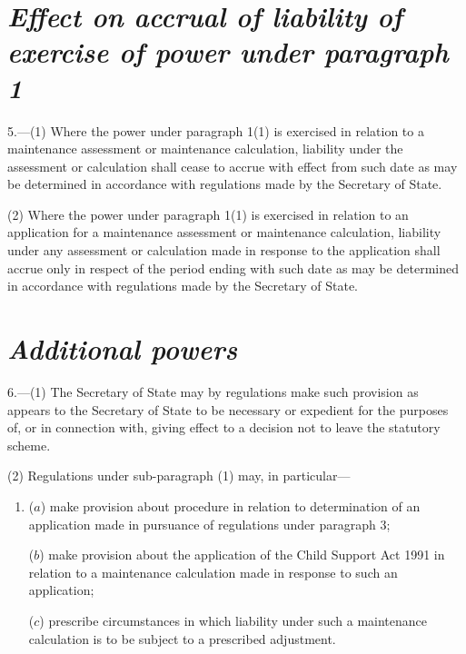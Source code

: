 \documentclass[12pt,a4paper]{article}
\begin{document}


\section*{\itshape Effect on accrual of liability of exercise of power under paragraph 1}

5.---(1) Where the power under paragraph 1(1) is exercised in relation to a maintenance assessment or maintenance calculation, liability under the assessment or calculation shall cease to accrue with effect from such date as may be determined in accordance with regulations made by the Secretary of State.

(2) Where the power under paragraph 1(1) is exercised in relation to an application for a maintenance assessment or maintenance calculation, liability under any assessment or calculation made in response to the application shall accrue only in respect of the period ending with such date as may be determined in accordance with regulations made by the Secretary of State.


\section*{\itshape Additional powers}

6.---(1) The Secretary of State may by regulations make such provision as appears to the Secretary of State to be necessary or expedient for the purposes of, or in connection with, giving effect to a decision not to leave the statutory scheme.

(2) Regulations under sub-paragraph (1) may, in particular—
\begin{enumerate}\item[]
($a$) make provision about procedure in relation to determination of an application made in pursuance of regulations under paragraph 3;

($b$) make provision about the application of the Child Support Act 1991 in relation to a maintenance calculation made in response to such an application;

($c$) prescribe circumstances in which liability under such a maintenance calculation is to be subject to a prescribed adjustment.
\end{enumerate}
\end{document}
